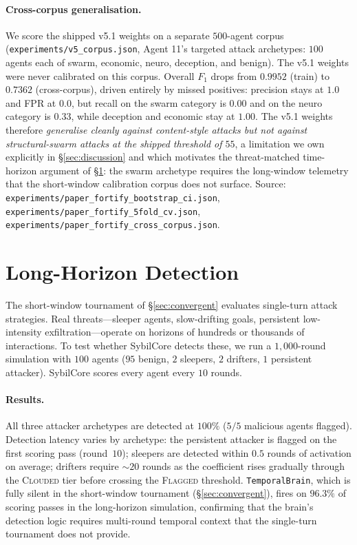 \documentclass{article}
\begin{document}
\paragraph{Cross-corpus generalisation.}
We score the shipped v5.1 weights on a separate $500$-agent corpus
(\texttt{experiments/v5\_corpus.json}, Agent 11's targeted attack
archetypes: $100$ agents each of \textsf{swarm},
\textsf{economic}, \textsf{neuro}, \textsf{deception}, and
\textsf{benign}). The v5.1 weights were never calibrated on this
corpus. Overall $F_1$ drops from $0.9952$ (train) to $0.7362$
(cross-corpus), driven entirely by missed positives: precision stays
at $1.0$ and FPR at $0.0$, but recall on the \textsf{swarm} category
is $0.00$ and on the \textsf{neuro} category is $0.33$, while
\textsf{deception} and \textsf{economic} stay at $1.00$. The v5.1
weights therefore \emph{generalise cleanly against content-style
attacks but not against structural-swarm attacks at the shipped
threshold of $55$}, a limitation we own explicitly in
\S\ref{sec:discussion} and which motivates the threat-matched
time-horizon argument of \S\ref{sec:longhorizon}: the swarm archetype
requires the long-window telemetry that the short-window calibration
corpus does not surface.
Source: \texttt{experiments/paper\_fortify\_bootstrap\_ci.json},
\texttt{experiments/paper\_fortify\_5fold\_cv.json},
\texttt{experiments/paper\_fortify\_cross\_corpus.json}.

\section{Long-Horizon Detection}
\label{sec:longhorizon}

The short-window tournament of \S\ref{sec:convergent} evaluates
single-turn attack strategies. Real threats---sleeper agents,
slow-drifting goals, persistent low-intensity exfiltration---operate
on horizons of hundreds or thousands of interactions. To test whether
SybilCore detects these, we run a $1{,}000$-round simulation with
$100$ agents ($95$ benign, $2$ sleepers, $2$ drifters, $1$
persistent attacker). SybilCore scores every agent every $10$ rounds.

\paragraph{Results.}
All three attacker archetypes are detected at $100\%$ ($5/5$
malicious agents flagged). Detection latency varies by archetype:
the persistent attacker is flagged on the first scoring pass
(round~$10$); sleepers are detected within $0.5$ rounds of
activation on average; drifters require $\sim\!20$ rounds as the
coefficient rises gradually through the \textsc{Clouded} tier before
crossing the \textsc{Flagged} threshold. \texttt{TemporalBrain},
which is fully silent in the short-window tournament
(\S\ref{sec:convergent}), fires on $96.3\%$ of scoring passes in
the long-horizon simulation, confirming that the brain's
detection logic requires multi-round temporal context that the
single-turn tournament does not provide.
\end{document}

